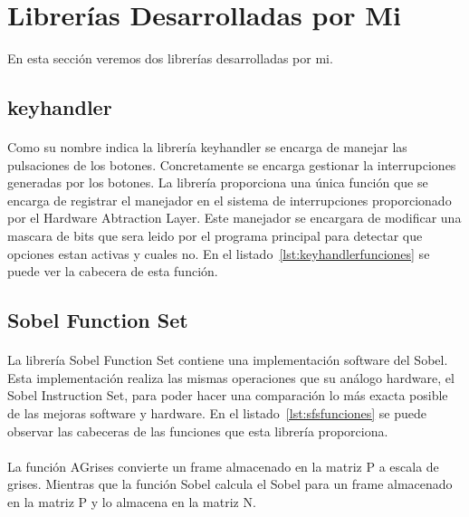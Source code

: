 \documentclass[a4paper,12pt,titlepage,final]{book}
\begin{document}
\section{Librerías Desarrolladas por Mi}
En esta sección veremos dos librerías desarrolladas por mi.
\subsection{keyhandler}
\paragraph{}
Como su nombre indica la librería keyhandler se encarga de manejar las pulsaciones de los botones. Concretamente se encarga gestionar la interrupciones generadas por los botones. La librería proporciona una única función que se encarga de registrar el manejador en el sistema de interrupciones proporcionado por el Hardware Abtraction Layer. Este manejador se encargara de modificar una mascara de bits que sera leido por el programa principal para detectar que opciones estan activas y cuales no. En el listado~\ref{lst:keyhandlerfunciones} se puede ver la cabecera de esta función.



\subsection{Sobel Function Set}
\paragraph{}
La librería Sobel Function Set contiene una implementación software del Sobel. Esta implementación realiza las mismas operaciones que su análogo hardware, el Sobel Instruction Set, para poder hacer una comparación lo más exacta posible de las mejoras software y hardware. En el listado~\ref{lst:sfsfunciones} se puede observar las cabeceras de las funciones que esta librería proporciona.



\paragraph{}
La función AGrises convierte un frame almacenado en la matriz P a escala de grises. Mientras que la función Sobel calcula el Sobel para un frame almacenado en la matriz P y lo almacena en la matriz N. 
\end{document}
